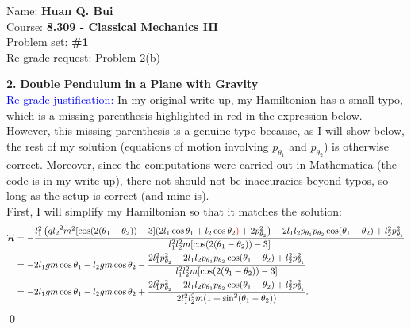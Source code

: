 \documentclass{article}
\theoremstyle{definition}
\newcommand{\ham}{\mathcal{H}}
\newcommand{\f}[2]{\frac{#1}{#2}}
\begin{document}
\begin{framed}
	\noindent Name: \textbf{Huan Q. Bui}\\
	Course: \textbf{8.309 - Classical Mechanics III}\\
	Problem set: \textbf{\#1}\\
	Re-grade request: Problem 2(b)
\end{framed}
	
	
	
\noindent \textbf{2. } \textbf{Double Pendulum in a Plane with Gravity}\\

	


\noindent \textcolor{blue}{Re-grade justification:} In my original write-up, my Hamiltonian has a small typo, which is a missing parenthesis highlighted in red in the expression below. However, this missing parenthesis is a genuine typo because, as I will show below, the rest of my solution (equations of motion involving $\dot{p}_{\theta_1}$ and $\dot{p}_{\theta_2}$) is otherwise correct. Moreover, since the computations were carried out in Mathematica (the code is in my write-up), there not should not be inaccuracies beyond typos, so long as the setup is correct (and mine is).  \\


\noindent First, I will simplify my Hamiltonian so that it matches the solution:
\begin{align*}
\ham &= 
-\frac{l_1^2 \left(g{l_2}^2 m^2 [\cos (2 (\theta_1-\theta_2))-3] 
	(2l_1 \cos \theta_1+l_2 \cos \theta_2 \textcolor{red}{)} + 2p_{\theta_2}^2\right)
	-2l_1l_2p_{\theta_1}p_{\theta_2} \cos (\theta_1-\theta_2)+ l_2^2 p_{\theta_1}^2}
{l_1^2l_2^2 m [\cos (2 (\theta_1-\theta_2))-3]}\\
&= -2l_1gm\cos\theta_1 - l_2gm\cos\theta_2 - \f{2l_1^2p_{\theta_2}^2 - 2l_1l_2 p_{\theta_1}p_{\theta_2}\cos(\theta_1 - \theta_2) + l_2^2p_{\theta_1}^2}{l_1^2l_2^2 m [\cos (2 (\theta_1-\theta_2))-3]}\\
&= -2l_1gm\cos\theta_1 - l_2gm\cos\theta_2 + 
\f{2l_1^2p_{\theta_2}^2 - 2l_1l_2p_{\theta_1}p_{\theta_2}\cos(\theta_1-\theta_2) + l_2^2p_{\theta_1}^2}{2l_1^2l_2^2m(1+\sin^2(\theta_1-\theta_2))}.
\end{align*}\qed
\end{document}
